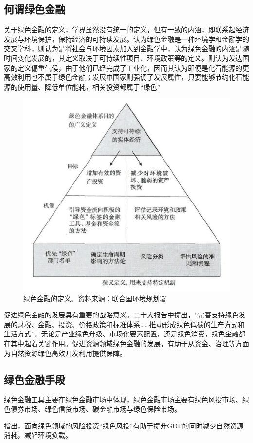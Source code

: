 \subsection*{何谓绿色金融}
关于绿色金融的定义，学界虽然没有统一的定义，但有一致的内涵，即联系起经济发展与环境保护，保持经济的可持续发展\cite{雷立钧2009绿色金融文献综述}。\citet{cowan1998topical}认为绿色金融是一种环境学和金融学的交叉学科，\citet{gray2002messiness}则认为是将社会与环境因素加入到金融学中，\citet{hohne2012mapping}认为绿色金融的内涵是随时间变化发展的，其定义取决于可持续性项目、环境政策等的定义。\citet*{张承惠2016发展中国绿色金融的逻辑与框架}则认为发达国家的定义偏重气候，由于他们已经完成了工业化，因而其认为即便是化石能源的更高效利用也不属于绿色金融；发展中国家则强调了发展属性，只要能够节约化石能源的使用量、降低单位能耗，相关投资都属于“绿色”
\begin{figure}[H]
    \centering
    \includegraphics[width=0.5\linewidth]{./img/绿色金融定义.jpeg}
    \caption{绿色金融的定义。资料来源：联合国环境规划署}
\end{figure}

促进绿色金融的发展具有重要的战略意义。二十大报告中提出，“完善支持绿色发展的财税、金融、投资、价格政策和标准体系……推动形成绿色低碳的生产方式和生活方式”。无论是产业绿色升级、市场化要素配置，还是绿色消费，绿色金融都在其中起着关键作用。促进资源领域绿色金融的发展，有助于从资金、治理等方面为自然资源绿色高效开发利用提供保障\cite{王遥2016绿色金融对中国经济发展的贡献研究}。

\subsection*{绿色金融手段}
绿色金融工具主要在绿色金融市场中体现，绿色金融市场主要有绿色风投市场、绿色债券市场、绿色信贷市场、碳金融市场与绿色保险市场\cite{姚秋池2017国内外绿色金融研究综述}。

\citet{刘曼红2009绿色风险投资助推绿色}指出，面向绿色领域的风险投资“绿色风投”有助于提升GDP的同时减少自然资源消耗，减轻环境负载。

